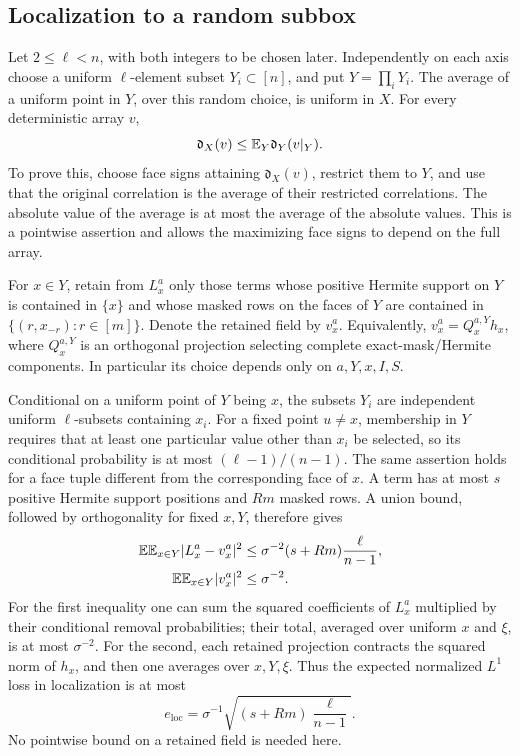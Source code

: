 \subsection{Localization to a random subbox}

Let $2\le\ell<n$, with both integers to be chosen later. Independently
on each axis choose a uniform $\ell$-element subset $Y_i\subset[n]$,
and put $Y=\prod_iY_i$. The average of a uniform point in $Y$, over
this random choice, is uniform in $X$. For every deterministic array
$v$,
\begin{equation}\label{eq:box-restriction}
 \mathfrak d_X(v)\le\mathbb E_Y\mathfrak d_Y(v|_Y).
\end{equation}
To prove this, choose face signs attaining $\mathfrak d_X(v)$, restrict
them to $Y$, and use that the original correlation is the average of
their restricted correlations. The absolute value of the average is at
most the average of the absolute values. This is a pointwise assertion
and allows the maximizing face signs to depend on the full array.

For $x\in Y$, retain from $L^a_x$ only those terms whose positive
Hermite support on $Y$ is contained in $\{x\}$ and whose masked rows
on the faces of $Y$ are contained in
$\{(r,x_{-r}):r\in[m]\}$. Denote the retained field by $v^a_x$.
Equivalently, $v^a_x=Q^{a,Y}_xh_x$, where $Q^{a,Y}_x$ is an
orthogonal projection selecting complete exact-mask/Hermite components.
In particular its choice depends only on $a,Y,x,I,S$.

Conditional on a uniform point of $Y$ being $x$, the subsets $Y_i$ are
independent uniform $\ell$-subsets containing $x_i$. For a fixed
point $u\ne x$, membership in $Y$ requires that at least one particular
value other than $x_i$ be selected, so its conditional probability is
at most $(\ell-1)/(n-1)$. The same assertion holds for a face tuple
different from the corresponding face of $x$. A term has at most $s$
positive Hermite support positions and $Rm$ masked rows. A union bound,
followed by orthogonality for fixed $x,Y$, therefore gives
\begin{align}
 \mathbb E\mathbb E_{x\in Y}|L^a_x-v^a_x|^2
 &\le \sigma^{-2}(s+Rm)\frac{\ell}{n-1},
 \label{eq:localization-l2}\\
 \mathbb E\mathbb E_{x\in Y}|v^a_x|^2&\le\sigma^{-2}.
 \label{eq:retained-energy}
\end{align}
For the first inequality one can sum the squared coefficients of
$L^a_x$ multiplied by their conditional removal probabilities; their
total, averaged over uniform $x$ and $\xi$, is at most $\sigma^{-2}$.
For the second, each retained projection contracts the squared norm
of $h_x$, and then one averages over $x,Y,\xi$. Thus the expected
normalized $L^1$ loss in localization is at most
\begin{equation}\label{eq:localization-loss}
 e_{\mathrm{loc}}=
 \sigma^{-1}\sqrt{(s+Rm)\frac{\ell}{n-1}}.
\end{equation}
No pointwise bound on a retained field is needed here.

